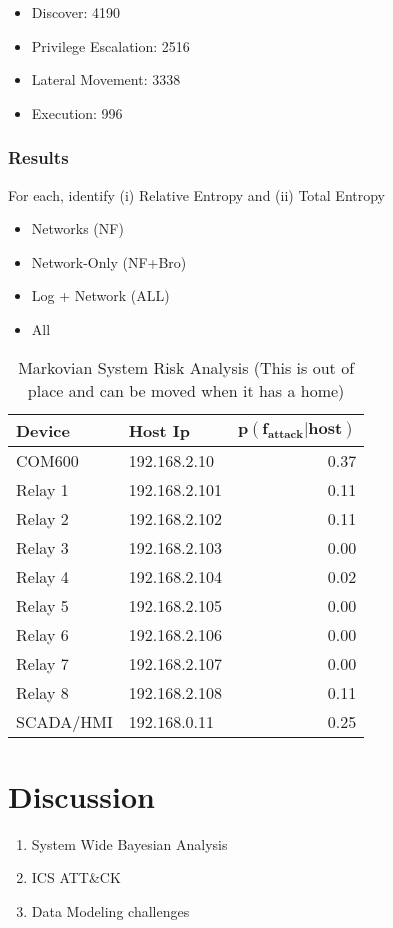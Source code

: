 \documentclass[journal]{IEEEtran}
\begin{document}
\begin{itemize}
\item Discover: 4190
\item Privilege Escalation: 2516
\item Lateral Movement: 3338
\item Execution: 996
\end{itemize}

\subsubsection{Results}


\color{red}
For each, identify (i) Relative Entropy and (ii) Total Entropy 
\begin{itemize}
\item Networks (NF)
\item Network-Only (NF+Bro)
\item Log + Network (ALL)
\item All
\end{itemize}

\color{black}

\begin{table}
\centering
\caption{Markovian System Risk Analysis (This is out of place and can be moved when it has a home)}
\label{tab:results}
\begin{tabular}{|l|l|r|}
\hline
\rowcolor[HTML]{EFEFEF}
\textbf{Device} & \textbf{Host Ip} & $\mathbf{p(f_{attack}|host)}$ \\\hline
COM600	&	192.168.2.10   & 0.37	\\\hline
Relay 1	&	192.168.2.101  & 0.11	\\\hline
Relay 2	&	192.168.2.102  & 0.11	\\\hline
Relay 3	&	192.168.2.103  & 0.00	\\\hline
Relay 4	&	192.168.2.104  & 0.02	\\\hline
Relay 5	&	192.168.2.105  & 0.00	\\\hline
Relay 6	&	192.168.2.106  & 0.00	\\\hline
Relay 7	&	192.168.2.107  & 0.00	\\\hline
Relay 8	&	192.168.2.108  & 0.11	\\\hline
SCADA/HMI &	192.168.0.11   & 0.25	\\\hline
\end{tabular}
\end{table}




\section{Discussion}
\begin{enumerate}
\item System Wide Bayesian Analysis
\item ICS ATT\&CK
\item Data Modeling challenges
\end{enumerate}
\end{document}
